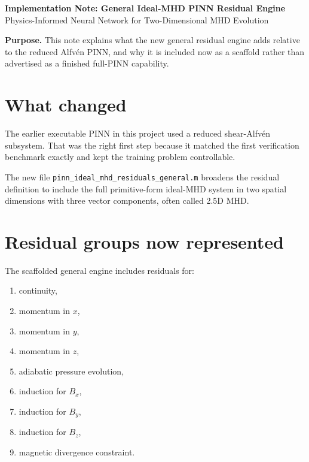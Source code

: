 \documentclass[11pt]{article}
\begin{document}
\begin{center}
    {\LARGE \bfseries \color{TitleBlue} Implementation Note: General Ideal-MHD PINN Residual Engine}\\[0.5em]
    {\large \color{AccentTeal} Physics-Informed Neural Network for Two-Dimensional MHD Evolution}
\end{center}

\vspace{0.5em}

\begin{overviewbox}
\textbf{Purpose.} This note explains what the new general residual engine adds relative to the reduced Alfv\'en PINN, and why it is included now as a scaffold rather than advertised as a finished full-PINN capability.
\end{overviewbox}

\section{What changed}
The earlier executable PINN in this project used a reduced shear-Alfv\'en subsystem. That was the right first step because it matched the first verification benchmark exactly and kept the training problem controllable.

The new file \texttt{pinn\_ideal\_mhd\_residuals\_general.m} broadens the residual definition to include the full primitive-form ideal-MHD system in two spatial dimensions with three vector components, often called 2.5D MHD.

\section{Residual groups now represented}
The scaffolded general engine includes residuals for:
\begin{enumerate}[leftmargin=1.8em]
    \item continuity,
    \item momentum in $x$,
    \item momentum in $y$,
    \item momentum in $z$,
    \item adiabatic pressure evolution,
    \item induction for $B_x$,
    \item induction for $B_y$,
    \item induction for $B_z$,
    \item magnetic divergence constraint.
\end{enumerate}
\end{document}

